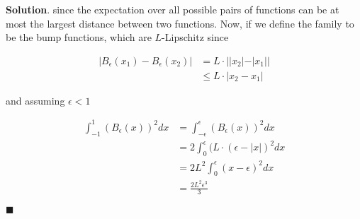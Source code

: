 \documentclass[12pt]{article}
\theoremstyle{definition}
\newenvironment{s}{%
        \begin{trivlist} \item \textbf{Solution}. }{%
            \hspace*{\fill} $\blacksquare$\end{trivlist}}%
\begin{document}
{\begin{s}
since the expectation over all possible pairs of functions can be at most the largest distance between two functions. Now, if we define the family to be the bump functions, which are $L$-Lipschitz since

\begin{align*}
|B_{\epsilon}(x_{1}) - B_{\epsilon}(x_{2})| &= L\cdot ||x_{2}|-|x_{1}||\\
&\leq L\cdot |x_{2}-x_{1}|
\end{align*}

and assuming $\epsilon < 1$

\begin{align*}
\int_{-1}^{1}(B_{\epsilon}(x))^{2}dx &= \int_{-\epsilon}^{\epsilon}(B_{\epsilon}(x))^{2}dx\\
&= 2\int_{0}^{\epsilon} (L\cdot (\epsilon-|x|)^{2}dx\\
&= 2L^{2}\int_{0}^{\epsilon} (x-\epsilon)^{2}dx\\
&= \frac{2L^{2}\epsilon^{3}}{3}
\end{align*}

\end{s}
\end{document}

